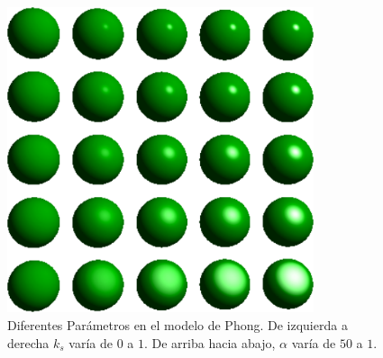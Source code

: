 \begin{figure}
\center
\includegraphics[width=9cm]{figures/phongparametros}
\caption[Diferentes Parámetros en el modelo de Phong]{Diferentes Parámetros en el modelo de Phong. De izquierda a derecha $k_{s}$ varía de $0$ a $1$. De arriba hacia abajo, $\alpha$ varía de $50$ a $1$.}
\label{fg:phongparametros}
\end{figure}



$$$$




